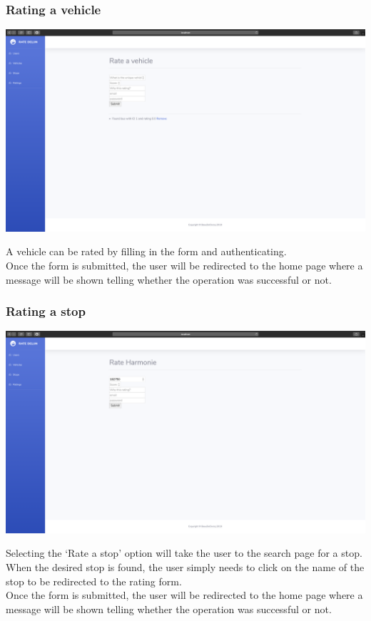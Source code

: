\documentclass[12pt]{article}
\begin{document}
\subsubsection{Rating a vehicle}
\begin{center}
	\includegraphics[width=\linewidth]{Images/Rate_vehicle.png}
\end{center}
A vehicle can be rated by filling in the form and authenticating. \\
Once the form is submitted, the user will be redirected to the home page where a message will be shown telling whether the operation was successful or not.

\subsubsection{Rating a stop}
\begin{center}
	\includegraphics[width=\linewidth]{Images/Rate_stop.png}
\end{center}
Selecting the `Rate a stop' option will take the user to the search page for a stop. When the desired stop is found, the user simply needs to click on the name of the stop to be redirected to the rating form.\\
Once the form is submitted, the user will be redirected to the home page where a message will be shown telling whether the operation was successful or not.
\end{document}

